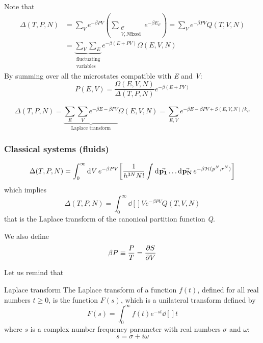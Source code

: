 \documentclass[../main/main.tex]{subfiles}
\begin{document}
\begin{remark}

Note that
\begin{equation*}
\begin{split}
\Delta (T,P,N)  &=  \sum_{V}^{} e^{-\beta PV } (\sum_{\substack{ \mathcal{C} \\ V,N \text{fixed}} }^{} e^{-\beta E_{\mathcal{C}}}  ) =  \sum_{V}^{} e^{-\beta PV} Q (T,V,N)       \\
& = \underbrace{\sum_{V}^{} \sum_{E}^{}}_{\substack{ \text{fluctuating} \\  \text{variables} } }  e^{-\beta (E+PV)} \Omega (E,V,N)
\end{split}
\end{equation*}
By summing over all the microstates compatible with \emph{E} and \emph{V}:
\begin{equation}
  P (E,V) = \frac{\Omega (E,V,N)}{\Delta (T,P,N)} e^{-\beta (E+PV)}
\end{equation}
\end{remark}
\begin{remark}
\begin{equation}
  \Delta (T,P,N) = \underbrace{ \sum_{E}^{} \sum_{V}^{} e^{-\beta E - \beta PV}}_{\text{Laplace transform}} \Omega (E,V,N) = \sum_{E,V}^{} e^{-\beta E- \beta PV + S(E,V,N)/k_B}
  \label{eq:4_5}
\end{equation}
\end{remark}




\subsubsection{Classical systems (fluids)}
\begin{equation}
  \Delta (T,P,N) = \int_{0}^{\infty } \dd[]{V} e^{-\beta PV} \qty[ \frac{1}{h^{3N}N!} \int_{}^{} \dd[]{\va{p_1}} \dots \dd[]{\va{p_N}} e^{-\beta \mathcal{H}(p^N,r^N)} ]
\end{equation}
which implies
\begin{equation}
  \Delta (T,P,N) = \int_{0}^{\infty } \dd[]{V} e^{-\beta PV} Q(T,V,N)
\end{equation}
that is the Laplace transform of the canonical partition function \emph{Q}.  

We also define
\begin{equation}
  \beta P \equiv \frac{P}{T} = \pdv{S}{V}
\end{equation}
\begin{remark}
Let us remind that
\begin{definition}{Laplace transform}{}
The Laplace transform of a function \(f(t) \), defined for all real numbers \(t \geq 0\), is the function \(F(s)\), which is a unilateral transform defined by
\begin{equation*}
 F(s)=\int _{0}^{\infty }f(t)e^{-st}  \dd[]{t}	
 \end{equation*}
 where \(s\) is a complex number frequency parameter  with real numbers \( \sigma \) and \( \omega \):
\begin{equation*}
    s=\sigma +i\omega 
\end{equation*}
\end{definition}
\end{remark}
\end{document}
